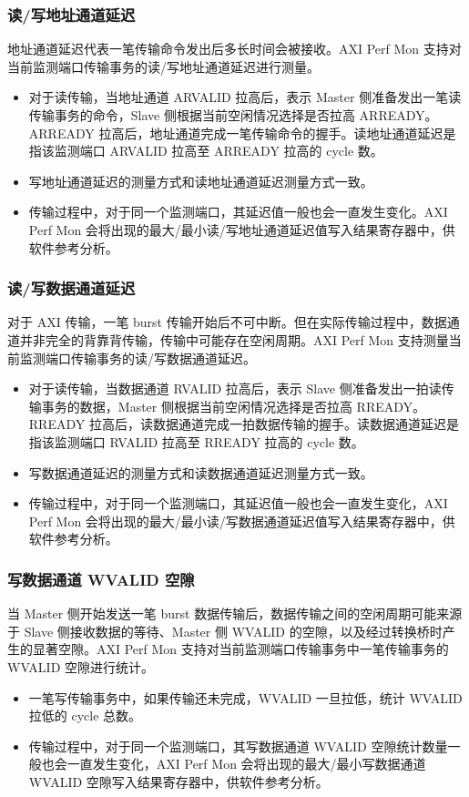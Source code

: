 \documentclass[main\_\_CN.tex]{subfiles}
\begin{document}
\subsubsection{读/写地址通道延迟}
地址通道延迟代表一笔传输命令发出后多长时间会被接收。AXI Perf Mon 支持对当前监测端口传输事务的读/写地址通道延迟进行测量。
\begin{itemize}
    \item 对于读传输，当地址通道 ARVALID 拉高后，表示 Master 侧准备发出一笔读传输事务的命令，Slave 侧根据当前空闲情况选择是否拉高 ARREADY。ARREADY 拉高后，地址通道完成一笔传输命令的握手。读地址通道延迟是指该监测端口 ARVALID 拉高至 ARREADY 拉高的 cycle 数。
    \item 写地址通道延迟的测量方式和读地址通道延迟测量方式一致。
    \item 传输过程中，对于同一个监测端口，其延迟值一般也会一直发生变化。AXI Perf Mon 会将出现的最大/最小读/写地址通道延迟值写入结果寄存器中，供软件参考分析。
\end{itemize}

\subsubsection{读/写数据通道延迟}
对于 AXI 传输，一笔 burst 传输开始后不可中断。但在实际传输过程中，数据通道并非完全的背靠背传输，传输中可能存在空闲周期。AXI Perf Mon 支持测量当前监测端口传输事务的读/写数据通道延迟。
\begin{itemize}
    \item 对于读传输，当数据通道 RVALID 拉高后，表示 Slave 侧准备发出一拍读传输事务的数据，Master 侧根据当前空闲情况选择是否拉高 RREADY。RREADY 拉高后，读数据通道完成一拍数据传输的握手。读数据通道延迟是指该监测端口 RVALID 拉高至 RREADY 拉高的 cycle 数。
    \item 写数据通道延迟的测量方式和读数据通道延迟测量方式一致。
    \item 传输过程中，对于同一个监测端口，其延迟值一般也会一直发生变化，AXI Perf Mon 会将出现的最大/最小读/写数据通道延迟值写入结果寄存器中，供软件参考分析。
\end{itemize}

\subsubsection{写数据通道 WVALID 空隙}
当 Master 侧开始发送一笔 burst 数据传输后，数据传输之间的空闲周期可能来源于 Slave 侧接收数据的等待、Master 侧 WVALID 的空隙，以及经过转换桥时产生的显著空隙。AXI Perf Mon 支持对当前监测端口传输事务中一笔传输事务的 WVALID 空隙进行统计。
\begin{itemize}
    \item 一笔写传输事务中，如果传输还未完成，WVALID 一旦拉低，统计 WVALID 拉低的 cycle 总数。 
    \item 传输过程中，对于同一个监测端口，其写数据通道 WVALID 空隙统计数量一般也会一直发生变化，AXI Perf Mon 会将出现的最大/最小写数据通道 WVALID 空隙写入结果寄存器中，供软件参考分析。
\end{itemize}
\end{document}
